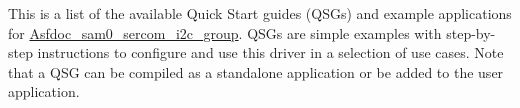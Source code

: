 This is a list of the available Quick Start guides (Q\+S\+Gs) and example applications for \mbox{\hyperlink{group__asfdoc__sam0__sercom__i2c__group}{Asfdoc\+\_\+sam0\+\_\+sercom\+\_\+i2c\+\_\+group}}. Q\+S\+Gs are simple examples with step-\/by-\/step instructions to configure and use this driver in a selection of use cases. Note that a Q\+SG can be compiled as a standalone application or be added to the user application. 